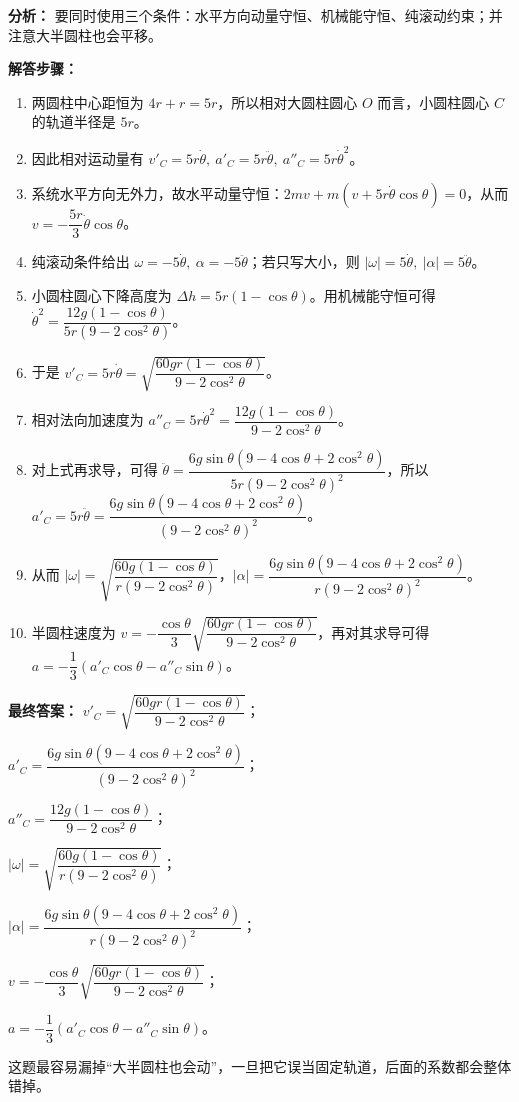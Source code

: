 \documentclass[12pt,a4paper]{ctexart}
\begin{document}
\begin{tcolorbox}[colback=blue!2!white,colframe=blue!55!black,title={完整答案}]
\textbf{分析：}
要同时使用三个条件：水平方向动量守恒、机械能守恒、纯滚动约束；并注意大半圆柱也会平移。\par
\textbf{解答步骤：}
\begin{enumerate}
\item 两圆柱中心距恒为 \(4r+r=5r\)，所以相对大圆柱圆心 \(O\) 而言，小圆柱圆心 \(C\) 的轨道半径是 \(5r\)。
\item 因此相对运动量有 \(v'_C=5r\dot\theta,\ a'_C=5r\ddot\theta,\ a''_C=5r\dot\theta^2\)。
\item 系统水平方向无外力，故水平动量守恒：\(2mv+m(v+5r\dot\theta\cos\theta)=0\)，从而 \(v=-\dfrac{5r}{3}\dot\theta\cos\theta\)。
\item 纯滚动条件给出 \(\omega=-5\dot\theta,\ \alpha=-5\ddot\theta\)；若只写大小，则 \(|\omega|=5\dot\theta,\ |\alpha|=5\ddot\theta\)。
\item 小圆柱圆心下降高度为 \(\Delta h=5r(1-\cos\theta)\)。用机械能守恒可得 \(\dot\theta^2=\dfrac{12g(1-\cos\theta)}{5r(9-2\cos^2\theta)}\)。
\item 于是 \(v'_C=5r\dot\theta=\sqrt{\dfrac{60gr(1-\cos\theta)}{9-2\cos^2\theta}}\)。
\item 相对法向加速度为 \(a''_C=5r\dot\theta^2=\dfrac{12g(1-\cos\theta)}{9-2\cos^2\theta}\)。
\item 对上式再求导，可得 \(\ddot\theta=\dfrac{6g\sin\theta(9-4\cos\theta+2\cos^2\theta)}{5r(9-2\cos^2\theta)^2}\)，所以 \(a'_C=5r\ddot\theta=\dfrac{6g\sin\theta(9-4\cos\theta+2\cos^2\theta)}{(9-2\cos^2\theta)^2}\)。
\item 从而 \(|\omega|=\sqrt{\dfrac{60g(1-\cos\theta)}{r(9-2\cos^2\theta)}}\)，\(|\alpha|=\dfrac{6g\sin\theta(9-4\cos\theta+2\cos^2\theta)}{r(9-2\cos^2\theta)^2}\)。
\item 半圆柱速度为 \(v=-\dfrac{\cos\theta}{3}\sqrt{\dfrac{60gr(1-\cos\theta)}{9-2\cos^2\theta}}\)，再对其求导可得 \(a=-\dfrac13(a'_C\cos\theta-a''_C\sin\theta)\)。
\end{enumerate}
\textbf{最终答案：}
\(v'_C=\sqrt{\dfrac{60gr(1-\cos\theta)}{9-2\cos^2\theta}}\)；\par
\(a'_C=\dfrac{6g\sin\theta(9-4\cos\theta+2\cos^2\theta)}{(9-2\cos^2\theta)^2}\)；\par
\(a''_C=\dfrac{12g(1-\cos\theta)}{9-2\cos^2\theta}\)；\par
\(|\omega|=\sqrt{\dfrac{60g(1-\cos\theta)}{r(9-2\cos^2\theta)}}\)；\par
\(|\alpha|=\dfrac{6g\sin\theta(9-4\cos\theta+2\cos^2\theta)}{r(9-2\cos^2\theta)^2}\)；\par
\(v=-\dfrac{\cos\theta}{3}\sqrt{\dfrac{60gr(1-\cos\theta)}{9-2\cos^2\theta}}\)；\par
\(a=-\dfrac13(a'_C\cos\theta-a''_C\sin\theta)\)。\par
\end{tcolorbox}
\begin{tcolorbox}[colback=red!2!white,colframe=red!55!black,title={易错点}]
这题最容易漏掉“大半圆柱也会动”，一旦把它误当固定轨道，后面的系数都会整体错掉。\par
\end{tcolorbox}
\end{document}
